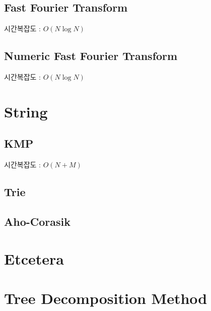 \documentclass[10pt,landscape,a4paper,twocolumn]{article}
\begin{document}
\subsection{Fast Fourier Transform}
시간복잡도 : $O(N\log{N})$


\subsection{Numeric Fast Fourier Transform}
시간복잡도 : $O(N\log{N})$




\section{String}
\subsection{KMP}
시간복잡도 : $O(N+M)$


\subsection{Trie}


\subsection{Aho-Corasik}



\iffalse
\section{Etcetera}
\section{Tree Decomposition Method}
\end{document}
